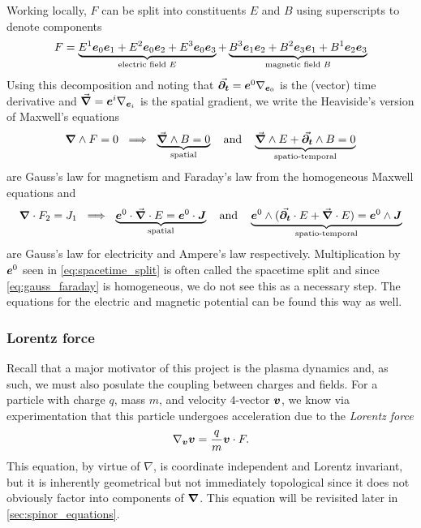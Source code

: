 \documentclass[conf]{new-aiaa}
\begin{document}
Working locally, $F$ can be split into constituents $E$ and $B$ using superscripts to denote components
\begin{align}
	F = \underbrace{E^1 \boldsymbol{e}_0 \boldsymbol{e}_1 + E^2 \boldsymbol{e}_0 \boldsymbol{e}_2 + E^3 \boldsymbol{e}_0 \boldsymbol{e}_3}_{\textrm{electric field } E} + \underbrace{B^{3} \boldsymbol{e}_1 \boldsymbol{e}_2 + B^{2} \boldsymbol{e}_3 \boldsymbol{e}_1 + B^{1} \boldsymbol{e}_2 \boldsymbol{e}_3}_{\textrm{magnetic field } B}
\end{align}
Using this decomposition and noting that $\vec{\boldsymbol{\partial_t}}=\boldsymbol{e}^0 \nabla_{\boldsymbol{e}_0}$ is the (vector) time derivative and  $\vec{\boldsymbol{\nabla}} = \boldsymbol{e}^i \nabla_{\boldsymbol{e}_i}$ is the spatial gradient, we write the Heaviside's version of Maxwell's equations
\begin{align}
\label{eq:gauss_faraday}
	\boldsymbol{\nabla} \wedge F=0 ~\implies~ \underbrace{\vec{\boldsymbol{\nabla}} \wedge B = 0}_{\textrm{spatial}} ~~~\textrm{and}~~~ \underbrace{\vec{\boldsymbol{\nabla}} \wedge E + \vec{\boldsymbol{\partial_t}} \wedge B = 0}_{\textrm{spatio-temporal}}
\end{align}
are Gauss's law for magnetism and Faraday's law from the homogeneous Maxwell equations and
\begin{align}
\label{eq:spacetime_split}
	\boldsymbol{\nabla} \cdot F_2=J_1 ~\implies~ \underbrace{\boldsymbol{e}^0 \cdot \vec{\boldsymbol{\nabla}} \cdot E = \boldsymbol{e}^0 \cdot \boldsymbol{J}}_{\textrm{spatial}}~~~\textrm{and}~~~ \underbrace{\boldsymbol{e}^0 \wedge (\vec{\boldsymbol{\partial_t}} \cdot E + \vec{\boldsymbol{\nabla}} \cdot E) = \boldsymbol{e}^0 \wedge \boldsymbol{J}}_{\textrm{spatio-temporal}}
\end{align}
are Gauss's law for electricity and Ampere's law respectively. Multiplication by $\boldsymbol{e}^0$ seen in \cref{eq:spacetime_split} is often called the spacetime split and since \cref{eq:gauss_faraday} is homogeneous, we do not see this as a necessary step. The equations for the electric and magnetic potential can be found this way as well.

\subsubsection{Lorentz force}

Recall that a major motivator of this project is the plasma dynamics and, as such, we must also posulate the coupling between charges and fields. For a particle with charge $q$, mass $m$, and velocity $4$-vector $\boldsymbol{v}$, we know via experimentation that this particle undergoes acceleration due to the \emph{Lorentz force} 
\begin{equation}
    \label{eq:lorentz_force}
    \nabla_{\boldsymbol{v}}\boldsymbol{v} = \frac{q}{m} \boldsymbol{v} \cdot F.
\end{equation}
This equation, by virtue of $\nabla$, is coordinate independent and Lorentz invariant, but it is inherently geometrical but not immediately topological since it does not obviously factor into components of $\boldsymbol{\nabla}$. This equation will be revisited later in \cref{sec:spinor_equations}.
\end{document}
